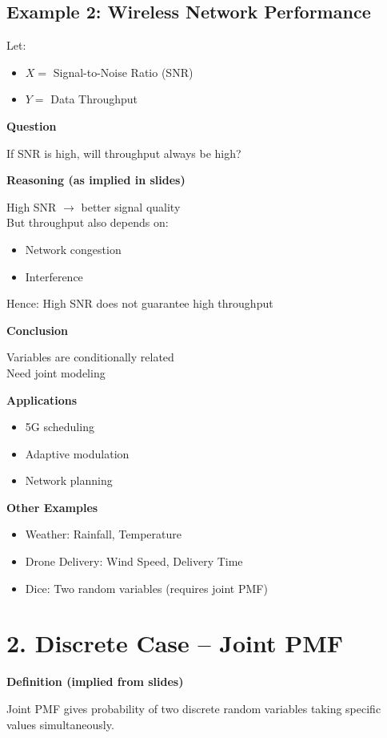 \documentclass[12pt]{article}
\begin{document}
\subsection*{Example 2: Wireless Network Performance}

Let:
\begin{itemize}
\item $X =$ Signal-to-Noise Ratio (SNR)
\item $Y =$ Data Throughput
\end{itemize}

\textbf{Question}

If SNR is high, will throughput always be high?

\textbf{Reasoning (as implied in slides)}

High SNR $\rightarrow$ better signal quality \\
But throughput also depends on:
\begin{itemize}
\item Network congestion
\item Interference
\end{itemize}

Hence:
High SNR does not guarantee high throughput

\textbf{Conclusion}

Variables are conditionally related \\
Need joint modeling

\textbf{Applications}
\begin{itemize}
\item 5G scheduling
\item Adaptive modulation
\item Network planning
\end{itemize}

\textbf{Other Examples}
\begin{itemize}
\item Weather: Rainfall, Temperature
\item Drone Delivery: Wind Speed, Delivery Time
\item Dice: Two random variables (requires joint PMF)
\end{itemize}

\section*{2. Discrete Case -- Joint PMF}

\textbf{Definition (implied from slides)}

Joint PMF gives probability of two discrete random variables taking specific values simultaneously.
\end{document}
